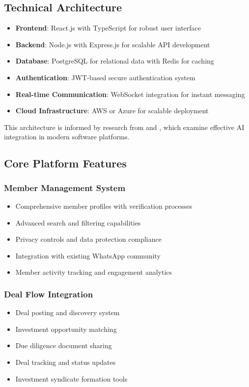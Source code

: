 \subsection{Technical Architecture}
\begin{itemize}
    \item \textbf{Frontend}: React.js with TypeScript for robust user interface
    \item \textbf{Backend}: Node.js with Express.js for scalable API development
    \item \textbf{Database}: PostgreSQL for relational data with Redis for caching
    \item \textbf{Authentication}: JWT-based secure authentication system
    \item \textbf{Real-time Communication}: WebSocket integration for instant messaging
    \item \textbf{Cloud Infrastructure}: AWS or Azure for scalable deployment
\end{itemize}

This architecture is informed by research from \citep{reiff_multiagent_sophisticated_system} and \citep{ferede_artificial_intelligence_ai}, which examine effective AI integration in modern software platforms.

\subsection{Core Platform Features}
\subsubsection{Member Management System}
\begin{itemize}
    \item Comprehensive member profiles with verification processes
    \item Advanced search and filtering capabilities
    \item Privacy controls and data protection compliance
    \item Integration with existing WhatsApp community
    \item Member activity tracking and engagement analytics
\end{itemize}

\subsubsection{Deal Flow Integration}
\begin{itemize}
    \item Deal posting and discovery system
    \item Investment opportunity matching
    \item Due diligence document sharing
    \item Deal tracking and status updates
    \item Investment syndicate formation tools
\end{itemize}

